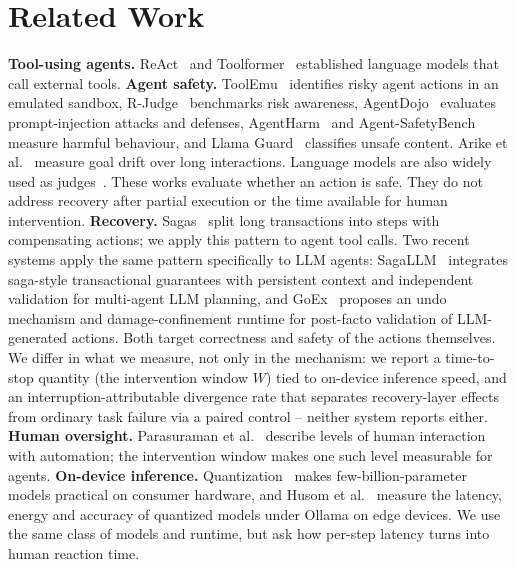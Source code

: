 \documentclass[conference]{IEEEtran}
\begin{document}
\section{Related Work}
\textbf{Tool-using agents.} ReAct~\cite{react} and Toolformer~\cite{toolformer} established language models that call external tools. \textbf{Agent safety.} ToolEmu~\cite{toolemu} identifies risky agent actions in an emulated sandbox, R-Judge~\cite{rjudge} benchmarks risk awareness, AgentDojo~\cite{agentdojo} evaluates prompt-injection attacks and defenses, AgentHarm~\cite{agentharm} and Agent-SafetyBench~\cite{agentsafetybench} measure harmful behaviour, and Llama Guard~\cite{llamaguard} classifies unsafe content. Arike et al.~\cite{goaldrift} measure goal drift over long interactions. Language models are also widely used as judges~\cite{mtbench}. These works evaluate whether an action is safe. They do not address recovery after partial execution or the time available for human intervention. \textbf{Recovery.} Sagas~\cite{sagas} split long transactions into steps with compensating actions; we apply this pattern to agent tool calls. Two recent systems apply the same pattern specifically to LLM agents: SagaLLM~\cite{sagallm} integrates saga-style transactional guarantees with persistent context and independent validation for multi-agent LLM planning, and GoEx~\cite{goex} proposes an undo mechanism and damage-confinement runtime for post-facto validation of LLM-generated actions. Both target correctness and safety of the actions themselves. We differ in what we measure, not only in the mechanism: we report a time-to-stop quantity (the intervention window $W$) tied to on-device inference speed, and an interruption-attributable divergence rate that separates recovery-layer effects from ordinary task failure via a paired control -- neither system reports either. \textbf{Human oversight.} Parasuraman et al.~\cite{parasuraman} describe levels of human interaction with automation; the intervention window makes one such level measurable for agents. \textbf{On-device inference.} Quantization~\cite{awq} makes few-billion-parameter models practical on consumer hardware, and Husom et al.~\cite{edgequant} measure the latency, energy and accuracy of quantized models under Ollama on edge devices. We use the same class of models and runtime, but ask how per-step latency turns into human reaction time.
\end{document}

